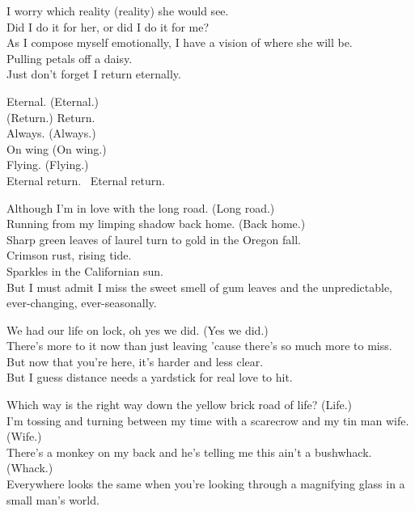 I worry which reality (reality) she would see. \\
Did I do it for her, or did I do it for me? \\
As I compose myself emotionally, I have a vision of where she will be. \\
Pulling petals off a daisy. \\
Just don't forget I return eternally. \\


Eternal. (Eternal.) \\
(Return.) Return. \\
Always. (Always.) \\
On wing (On wing.) \\
Flying. (Flying.) \\
Eternal return. \
Eternal return. \\


Although I'm in love with the long road. (Long road.) \\
Running from my limping shadow back home. (Back home.) \\
Sharp green leaves of laurel turn to gold in the Oregon fall. \\
Crimson rust, rising tide. \\
Sparkles in the Californian sun. \\
But I must admit I miss the sweet smell of gum leaves and the unpredictable, ever-changing, ever-seasonally. \\


We had our life on lock, oh yes we did. (Yes we did.) \\
There's more to it now than just leaving 'cause there's so much more to miss. \\
But now that you're here, it's harder and less clear. \\
But I guess distance needs a yardstick for real love to hit. \\


Which way is the right way down the yellow brick road of life? (Life.) \\
I'm tossing and turning between my time with a scarecrow and my tin man wife. (Wife.) \\
There's a monkey on my back and he's telling me this ain't a bushwhack. (Whack.) \\
Everywhere looks the same when you're looking through a magnifying glass in a small man's world. \\

